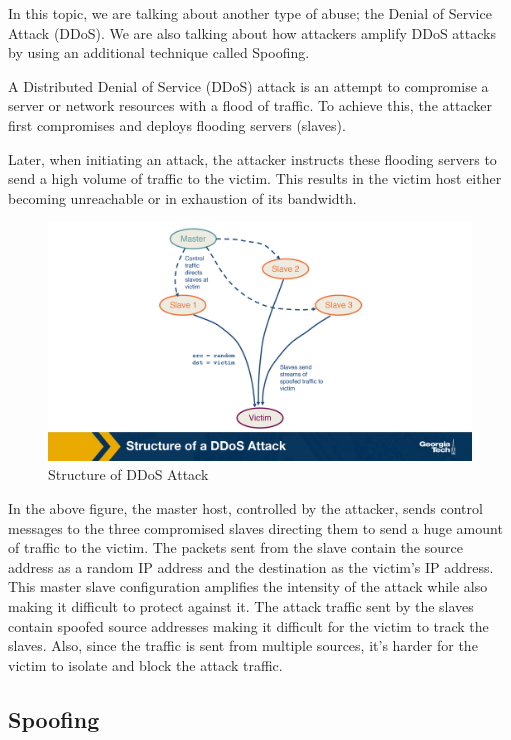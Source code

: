 \documentclass[11pt]{article}
\begin{document}
In this topic, we are talking about another type of abuse; the Denial of Service Attack (DDoS). We are also talking about how attackers amplify DDoS attacks by using an additional technique called Spoofing. 

A Distributed Denial of Service (DDoS) attack is an attempt to compromise a server or network resources with a flood of traffic. To achieve this, the attacker first compromises and deploys flooding servers (slaves). 

Later, when initiating an attack, the attacker instructs these flooding servers to send a high volume of traffic to the victim. This results in the victim host either becoming unreachable or in exhaustion of its bandwidth.

\begin{figure}[htbp]
\centering
\includegraphics[width=.9\linewidth]{./MD_Figures/9_structure_of_ddos.png}
\caption{\label{fig:org9ac69fd}Structure of DDoS Attack}
\end{figure}

In the above figure, the master host, controlled by the attacker, sends control messages to the three compromised slaves directing them to send a huge amount of traffic to the victim. The packets sent from the slave contain the source address as a random IP address and the destination as the victim’s IP address. This master slave configuration amplifies the intensity of the attack while also making it difficult to protect against it. The attack traffic sent by the slaves contain spoofed source addresses making it difficult for the victim to track the slaves. Also, since the traffic is sent from multiple sources, it’s harder for the victim to isolate and block the attack traffic.

\subsection{Spoofing}
\label{sec:orgad75eb0}
\end{document}
